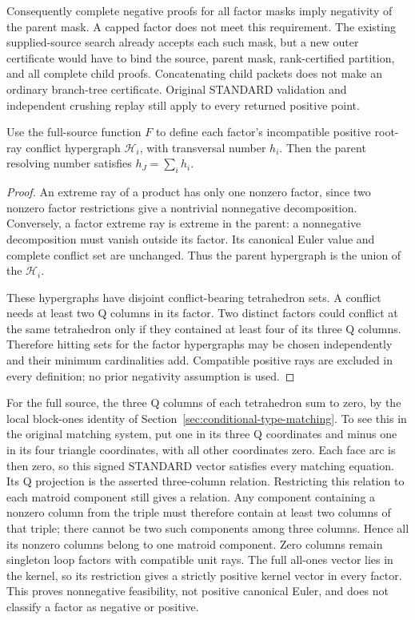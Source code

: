 Consequently complete negative proofs for all factor masks imply negativity
of the parent mask.  A capped factor does not meet this requirement.  The
existing supplied-source search already accepts each such mask, but a new
outer certificate would have to bind the source, parent mask, rank-certified
partition, and all complete child proofs.  Concatenating child packets does
not make an ordinary branch-tree certificate.  Original STANDARD validation
and independent crushing replay still apply to every returned positive point.

\begin{proposition}
Use the full-source function $F$ to define each factor's incompatible positive
root-ray conflict hypergraph $\mathcal H_i$, with transversal number $h_i$.
Then the parent resolving number satisfies $h_J=\sum_i h_i$.
\end{proposition}
\begin{proof}
An extreme ray of a product has only one nonzero factor, since two nonzero
factor restrictions give a nontrivial nonnegative decomposition.  Conversely,
a factor extreme ray is extreme in the parent: a nonnegative decomposition
must vanish outside its factor.  Its canonical Euler value and complete
conflict set are unchanged.  Thus the parent hypergraph is the union of the
$\mathcal H_i$.

These hypergraphs have disjoint conflict-bearing tetrahedron sets.  A conflict
needs at least two Q columns in its factor.  Two distinct factors could conflict
at the same tetrahedron only if they contained at least four of its three Q
columns.  Therefore hitting sets for the factor hypergraphs may be chosen
independently and their minimum cardinalities add.  Compatible positive rays
are excluded in every definition; no prior negativity assumption is used.
\end{proof}

For the full source, the three Q columns of each tetrahedron sum to zero,
by the local block-ones identity of Section~\ref{sec:conditional-type-matching}.
To see this in the original matching system, put one in its three Q
coordinates and minus one in its four triangle coordinates, with all
other coordinates zero.  Each face arc is then zero, so this signed
STANDARD vector satisfies every matching equation.  Its Q projection
is the asserted three-column relation.  Restricting this relation to each
matroid component still gives a relation.  Any component containing a nonzero
column from the triple must therefore contain at least two columns of that
triple; there cannot be two such components among three columns.  Hence all
its nonzero columns belong to one matroid component.  Zero columns remain
singleton loop factors with compatible unit rays.  The full all-ones vector
lies in the kernel, so its restriction gives a strictly positive kernel vector in every factor.
This proves nonnegative feasibility, not positive canonical Euler, and does
not classify a factor as negative or positive.


